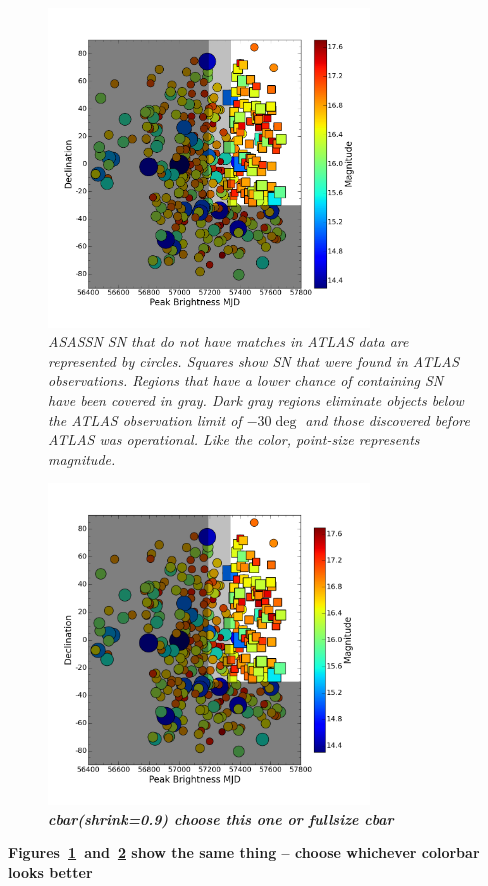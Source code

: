 \begin{figure}[H]%
  \begin{center}
\centerline{\includegraphics[width=3.35in]{figures/invert_mag.png}}
\caption{\it \small{ASASSN SN that do not have matches in ATLAS data are represented by circles. Squares show SN that were found in ATLAS observations. Regions that have a lower chance of containing SN have been covered in gray. Dark gray regions eliminate objects below the ATLAS observation limit of $-30\deg$ and those discovered before ATLAS was operational. Like the color, point-size represents magnitude.~\label{fig:dec_mjd}}}
  \end{center}
\end{figure}

\begin{figure}[H]%
  \begin{center}
\centerline{\includegraphics[width=3.35in]{figures/invert_mag_shrink_9.png}}
\caption{\it \small{{\bf cbar(shrink=0.9) choose this one or fullsize cbar} \label{fig:dec_mjd2}}}
  \end{center}
\end{figure}

{\bf Figures~\ref{fig:dec_mjd}~and~\ref{fig:dec_mjd2} show the same thing -- choose whichever colorbar looks better}

